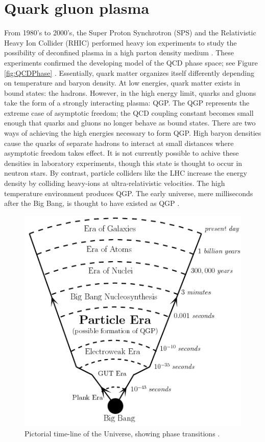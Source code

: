 \section{Quark gluon plasma}

From 1980's to 2000's, the Super Proton Synchrotron (SPS) and the Relativistic Heavy Ion Collider (RHIC) performed heavy ion experiments to study the possibility of deconfined plasma in a high parton density medium \cite{spsHI}\cite{ags2rhic}\cite{etaOvSinit}. These experiments confirmed the developing model of the QCD phase space; see Figure \ref{fig:QCDPhase} \cite{Bhalerao:1695331}. Essentially, quark matter organizes itself differently depending on temperature and baryon density. At low energies, quark matter exists in bound states: the hadrons. However, in the high energy limit, quarks and gluons take the form of a strongly interacting plasma: QGP. The QGP represents the extreme case of asymptotic freedom; the QCD coupling constant becomes small enough that quarks and gluons no longer behave as bound states. There are two ways of achieving the high energies necessary to form QGP. High baryon densities cause the quarks of separate hadrons to interact at small distances where asymptotic freedom takes effect. It is not currently possible to achive these densities in laboratory experiments, though this state is thought to occur in neutron stars. By contrast, particle colliders like the LHC increase the energy density by colliding heavy-ions at ultra-relativistic velocities. The high temperature environment produces QGP. The early universe, mere milliseconds after the Big Bang, is thought to have existed as QGP \cite{Hands:2001ve}.


\begin{figure}[h!]
\begin{centering}
\includegraphics[width=5in]{Chapter1/importfigs/fig_bb_timeline.png}
\par\end{centering}
\caption{Pictorial time-line of the Universe, showing phase transitions \cite{Bandyopadhyay:2017wip}. \label{fig:history}}
\end{figure}

